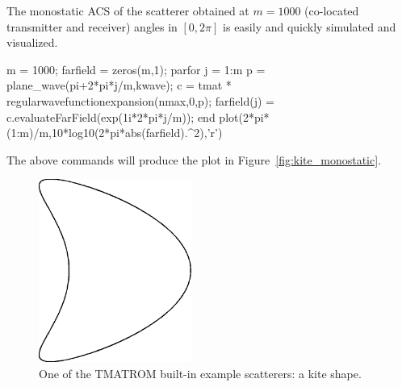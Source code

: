 \documentclass[12pt,letterpaper,final]{article}
\begin{document}
The monostatic ACS of the scatterer obtained at  $m = 1000$ (co-located transmitter and receiver)  angles in $[0, 2\pi]$
is easily and quickly simulated and visualized. 
\begin{matlab}
m = 1000;
farfield = zeros(m,1);
parfor j = 1:m
    p = plane_wave(pi+2*pi*j/m,kwave);
    c = tmat * regularwavefunctionexpansion(nmax,0,p);
    farfield(j) = c.evaluateFarField(exp(1i*2*pi*j/m));
end
plot(2*pi*(1:m)/m,10*log10(2*pi*abs(farfield).^2),'r')
\end{matlab}
The above commands will produce the plot in Figure~\ref{fig:kite_monostatic}.

\begin{figure}[!ht]
\centering
\includegraphics[width=5cm]{kite}
\caption{\label{fig:kite}
One of the TMATROM  built-in example scatterers: a kite shape.}
\end{figure}
\end{document}
